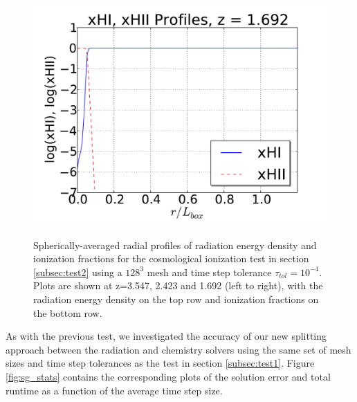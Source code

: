 \begin{figure}[t]
{  \includegraphics[scale=0.3, trim=1.0cm 0.5cm 1.0cm 0.5cm]{sg-profiles_10.pdf}
  \hfill}
  \caption{Spherically-averaged radial profiles of radiation energy
    density and ionization fractions for the cosmological ionization
    test in section \ref{subsec:test2} using a $128^3$ mesh and
    time step tolerance $\tau_{tol} =10^{-4}$.  Plots are shown at z=3.547, 2.423 and 1.692
    (left to right), with the radiation energy density on
    the top row and ionization fractions on the bottom row.}
  \label{fig:sg_results}
\end{figure}
As with the previous test, we investigated the accuracy of our new
splitting approach between the radiation and chemistry solvers using
the same set of mesh sizes and time step tolerances as the test in
section \ref{subsec:test1}.  Figure \ref{fig:sg_stats} contains the
corresponding plots of the solution error and total runtime as a
function of the average time step size.  
